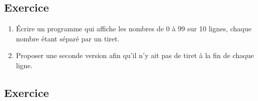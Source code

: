 \documentclass[11pt,a4paper]{article}
\newcounter{numexo}
\begin{document}
\addtocounter{numexo}{1}
\subsection*{\Large Exercice \thenumexo }
\begin{enumerate}
\item Écrire un programme qui affiche les nombres de 0 à 99 sur 10 lignes, chaque nombre étant séparé par un tiret.
\item Proposer une seconde version afin qu'il n'y ait pas de tiret à la fin de chaque ligne.
\end{enumerate}

\newpage
\addtocounter{numexo}{1}
\subsection*{\Large Exercice \thenumexo }
\end{document}
